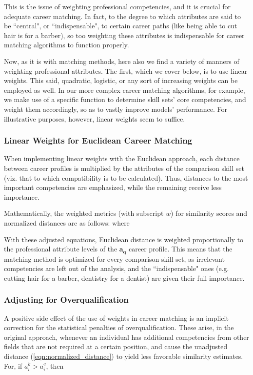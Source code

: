\documentclass{article}
\begin{document}
This is the issue of weighting professional competencies, and it is crucial for
adequate career matching. In fact, to the degree to which attributes are said
to be ``central", or ``indispensable", to certain career paths (like being able
to cut hair is for a barber), so too weighting these attributes is
indispensable for career matching algorithms to function properly.

Now, as it is with matching methods, here also we find a variety of manners of
weighting professional attributes. The first, which we cover below, is to use
linear weights. This said, quadratic, logistic, or any sort of increasing
weights can be employed as well. In our more complex career matching
algorithms, for example, we make use of a specific function to determine skill
sets' core competencies, and weight them accordingly, so as to vastly improve
models' performance. For illustrative purposes, however, linear weights seem to
suffice.

\subsubsection{Linear Weights for Euclidean Career Matching}
When implementing linear weights with the Euclidean approach, each distance
between career profiles is multiplied by the attributes of the comparison skill
set (viz. that to which compatibility is to be calculated). Thus, distances to
the most important competencies are emphasized, while the remaining receive
less importance.

Mathematically, the weighted metrics (with subscript $w$) for similarity scores
and normalized distances are as follows: \EqnWeightedSimilarity where
\EqnWeightedDistance

With these adjusted equations, Euclidean distance is weighted proportionally to
the professional attribute levels of the $\boldsymbol{a_{q}}$ career profile.
This means that the matching method is optimized for every comparison skill
set, as irrelevant competencies are left out of the analysis, and the
``indispensable" ones (e.g. cutting hair for a barber, dentistry for a dentist)
are given their full importance.

\subsubsection{Adjusting for Overqualification}
A positive side effect of the use of weights in career matching is an implicit
correction for the statistical penalties of overqualification. These arise, in
the original approach, whenever an individual has additional competencies from
other fields that are not required at a certain position, and cause the
unadjusted distance (\ref{eqn:normalized_distance}) to yield less favorable
similarity estimates. For, if $a_{i}^{k} > a_{i}^{q}$, then
\EqnDistanceDerivative
\end{document}
